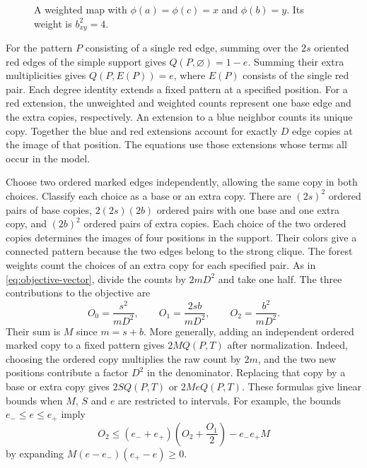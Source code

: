 \documentclass[preprint,11pt,numbers]{elsarticle-arxiv}
\numberwithin{equation}{section}
\theoremstyle{definition}
\begin{document}
\begin{figure}[htbp]
\centering
{}
\caption{A weighted map with $\phi(a)=\phi(c)=x$ and $\phi(b)=y$.
Its weight is $b_{xy}^2=4$.}
\label{fig:weighted-maps}
\end{figure}

For the pattern $P$ consisting of a single red edge, summing over the
$2s$ oriented red edges of the simple support gives $Q(P,\varnothing)=1-e$. Summing their extra
multiplicities gives $Q(P,E(P))=e$, where $E(P)$ consists of the
single red pair. Each degree identity extends a fixed pattern
at a specified position. For a red extension, the unweighted and
weighted counts represent one base edge and the extra copies,
respectively. An extension to a blue neighbor counts its unique copy.
Together the blue and red extensions account for exactly
$D$ edge copies at the image of that position. The equations use
those extensions whose terms all occur in the model.

Choose two ordered marked edges independently, allowing the same
copy in both choices. Classify each choice as a base or an extra
copy. There are $(2s)^2$ ordered pairs of base copies,
$2(2s)(2b)$ ordered pairs with one base and one extra copy, and
$(2b)^2$ ordered pairs of extra copies. Each choice of the two
ordered copies determines the images of four positions in the
support. Their colors give a connected pattern because the two
edges belong to the strong clique. The forest weights count the
choices of an extra copy for each specified pair. As in
\eqref{eq:objective-vector}, divide the counts by $2mD^2$ and take
one half. The three contributions to the objective are
\[
 O_0=\frac{s^2}{mD^2},\qquad
 O_1=\frac{2sb}{mD^2},\qquad
 O_2=\frac{b^2}{mD^2}.
\]
Their sum is $M$ since $m=s+b$. More generally, adding an independent
ordered marked copy to a fixed pattern gives $2M Q(P,T)$
after normalization. Indeed, choosing the ordered copy multiplies the raw count by
$2m$, and the two new positions contribute a factor $D^2$ in the denominator. Replacing that copy by a base
or extra copy gives $2S Q(P,T)$ or $2Me Q(P,T)$. These formulas
give linear bounds when $M$, $S$ and $e$ are restricted to intervals.
For example, the bounds $e_-\le e\le e_+$ imply
\[
 O_2\le(e_-+e_+)\left(O_2+\frac{O_1}{2}\right)-e_-e_+M
\]
by expanding $M(e-e_-)(e_+-e)\ge0$.
\end{document}
